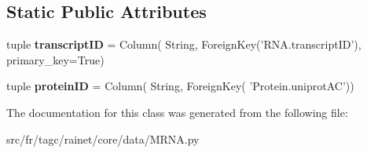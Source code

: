 \subsection*{Static Public Attributes}
\begin{DoxyCompactItemize}
\item 
\hypertarget{classsrc_1_1fr_1_1tagc_1_1rainet_1_1core_1_1data_1_1MRNA_1_1MRNA_a68d34a6659a265cc9a3f80134d075d59}{tuple {\bfseries transcript\-I\-D} = Column( String, Foreign\-Key('R\-N\-A.\-transcript\-I\-D'), primary\-\_\-key=True)}\label{classsrc_1_1fr_1_1tagc_1_1rainet_1_1core_1_1data_1_1MRNA_1_1MRNA_a68d34a6659a265cc9a3f80134d075d59}

\item 
\hypertarget{classsrc_1_1fr_1_1tagc_1_1rainet_1_1core_1_1data_1_1MRNA_1_1MRNA_a28db07076ce4e5ec9a4bf7d2d330cc72}{tuple {\bfseries protein\-I\-D} = Column( String, Foreign\-Key( 'Protein.\-uniprot\-A\-C'))}\label{classsrc_1_1fr_1_1tagc_1_1rainet_1_1core_1_1data_1_1MRNA_1_1MRNA_a28db07076ce4e5ec9a4bf7d2d330cc72}

\end{DoxyCompactItemize}


The documentation for this class was generated from the following file\-:\begin{DoxyCompactItemize}
\item 
src/fr/tagc/rainet/core/data/M\-R\-N\-A.\-py\end{DoxyCompactItemize}
